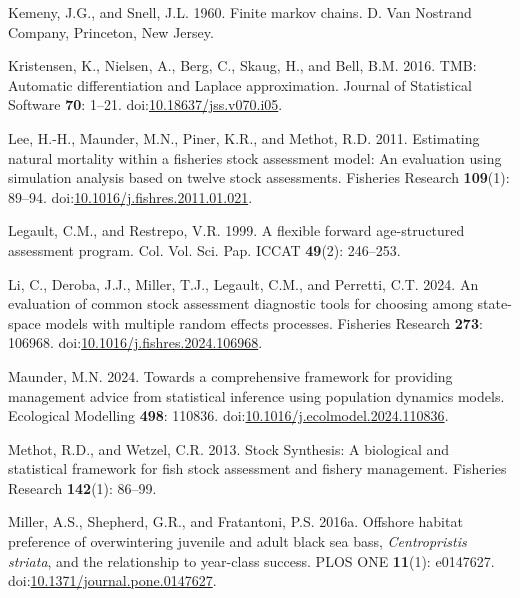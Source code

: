 \documentclass[
]{article}
\newlength{\cslhangindent}
\newlength{\cslentryspacingunit} %
\newenvironment{CSLReferences}[2] %
 {%
  \setlength{\parindent}{0pt}
  \ifodd #1
  \let\oldpar\par
  \def\par{\hangindent=\cslhangindent\oldpar}
  \fi
  \setlength{\parskip}{#2\cslentryspacingunit}
 }%
 {}
\begin{document}
\begin{CSLReferences}{1}{0}
\leavevmode{}%
Kemeny, J.G., and Snell, J.L. 1960. Finite markov chains. D. Van
Nostrand Company, Princeton, New Jersey.

\leavevmode{}%
Kristensen, K., Nielsen, A., Berg, C., Skaug, H., and Bell, B.M. 2016.
{TMB}: Automatic differentiation and {Laplace} approximation. Journal of
Statistical Software \textbf{70}: 1--21.
doi:\href{https://doi.org/10.18637/jss.v070.i05}{10.18637/jss.v070.i05}.

\leavevmode{}%
Lee, H.-H., Maunder, M.N., Piner, K.R., and Methot, R.D. 2011.
Estimating natural mortality within a fisheries stock assessment model:
An evaluation using simulation analysis based on twelve stock
assessments. Fisheries Research \textbf{109}(1): 89--94.
doi:\href{https://doi.org/10.1016/j.fishres.2011.01.021}{10.1016/j.fishres.2011.01.021}.

\leavevmode{}%
Legault, C.M., and Restrepo, V.R. 1999. A flexible forward
age-structured assessment program. Col. Vol. Sci. Pap. ICCAT
\textbf{49}(2): 246--253.

\leavevmode{}%
Li, C., Deroba, J.J., Miller, T.J., Legault, C.M., and Perretti, C.T.
2024. An evaluation of common stock assessment diagnostic tools for
choosing among state-space models with multiple random effects
processes. Fisheries Research \textbf{273}: 106968.
doi:\href{https://doi.org/10.1016/j.fishres.2024.106968}{10.1016/j.fishres.2024.106968}.

\leavevmode{}%
Maunder, M.N. 2024. Towards a comprehensive framework for providing
management advice from statistical inference using population dynamics
models. Ecological Modelling \textbf{498}: 110836.
doi:\href{https://doi.org/10.1016/j.ecolmodel.2024.110836}{10.1016/j.ecolmodel.2024.110836}.

\leavevmode{}%
Methot, R.D., and Wetzel, C.R. 2013. Stock {S}ynthesis: A biological and
statistical framework for fish stock assessment and fishery management.
Fisheries Research \textbf{142}(1): 86--99.

\leavevmode{}%
Miller, A.S., Shepherd, G.R., and Fratantoni, P.S. 2016a. Offshore
habitat preference of overwintering juvenile and adult black sea bass,
\emph{{C}entropristis} \emph{striata}, and the relationship to
year-class success. {PLOS} {ONE} \textbf{11}(1): e0147627.
doi:\href{https://doi.org/10.1371/journal.pone.0147627}{10.1371/journal.pone.0147627}.


\end{CSLReferences}
\end{document}
